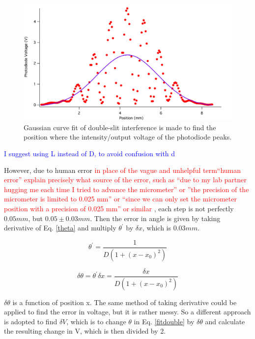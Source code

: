 \documentclass[prb,preprint]{revtex4-1}
\begin{document}
\begin{figure}[h]
\centering
\includegraphics[width=7in]{doublegaus.pdf}
\caption{Gaussian curve fit of double-slit interference is made to find the position where the intensity/output voltage of the photodiode peaks.}
\label{gasfit}
\end{figure}
\textcolor{blue}{I suggest using L instead of D, to avoid confusion with d}

However, due to human error \textcolor{red}{in place of the vague and unhelpful term``human error'' explain precisely what source of the error, such as ``due to my lab partner hugging me each time I tried to advance the micrometer'' or ''the precision of the micrometer is limited to 0.025 mm'' or ``since we can only set the micrometer position with a precision of 0.025 mm'' or similar} , each step is not perfectly $0.05 mm$, but $0.05\pm0.03 mm$.
Then the error in angle is given by taking derivative of Eq. \ref{theta} and multiply $\theta^\prime$ by $\delta x$, which is $0.03 mm$. 

\begin{equation}
\theta^\prime = \frac{1}{D(1+(x-x_0)^2)}
\label{thetaprime}
\end{equation}

\begin{equation}
\delta\theta = \theta^\prime \delta x = \frac{\delta x}{D(1+(x-x_0)^2)}
\label{deltatheta}
\end{equation}

$\delta\theta$ is a function of position x. The same method of taking derivative could be applied to find the error in voltage, but it is rather messy. So a different approach is adopted to find $\delta V$, which is to change $\theta$ in Eq. \ref{fitdouble} by $\delta\theta$ and calculate the resulting change in V, which is then divided by 2.
\end{document}

